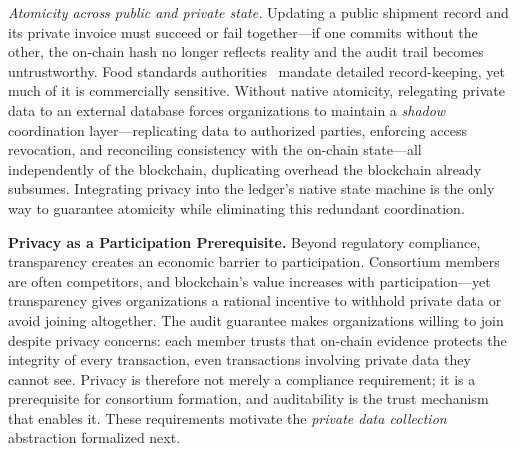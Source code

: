 \textit{Atomicity across public and private state.}
Updating a public shipment record and its private invoice must succeed or fail together---if one commits without the other, the on-chain hash no longer reflects reality and the audit trail becomes untrustworthy. Food standards authorities~\cite{fs, eu-foodsafety, fao-traceability} mandate detailed record-keeping, yet much of it is commercially sensitive. Without native atomicity, relegating private data to an external database forces organizations to maintain a \textit{shadow} coordination layer---replicating data to authorized parties, enforcing access revocation, and reconciling consistency with the on-chain state---all independently of the blockchain, duplicating overhead the blockchain already subsumes. Integrating privacy into the ledger's native state machine is the only way to guarantee atomicity while eliminating this redundant coordination.

\textbf{Privacy as a Participation Prerequisite.}
Beyond regulatory compliance, transparency creates an economic barrier to participation. Consortium members are often competitors, and blockchain's value increases with participation---yet transparency gives organizations a rational incentive to withhold private data or avoid joining altogether. The audit guarantee makes organizations willing to join despite privacy concerns: each member trusts that on-chain evidence protects the integrity of every transaction, even transactions involving private data they cannot see. Privacy is therefore not merely a compliance requirement; it is a prerequisite for consortium formation, and auditability is the trust mechanism that enables it. These requirements motivate the \textit{private data collection} abstraction formalized next.
